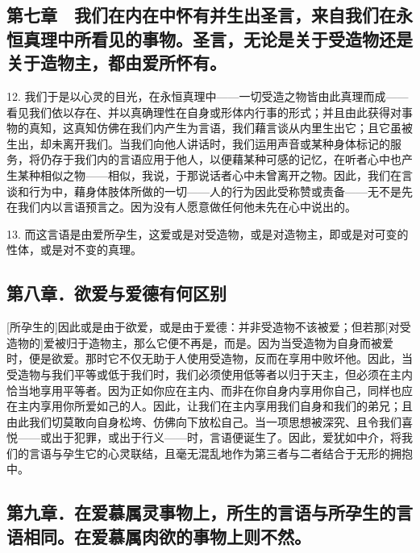 
\subsection{第七章　我们在内在中怀有并生出圣言，来自我们在永恒真理中所看见的事物。圣言，无论是关于受造物还是关于造物主，都由爱所怀有。}

12. 我们于是以心灵的目光，在永恒真理中——一切受造之物皆由此真理而成——看见我们依以存在、并以真确理性在自身或形体内行事的形式；并且由此获得对事物的真知，这真知仿佛在我们内产生为言语，我们藉言谈从内里生出它；且它虽被生出，却未离开我们。当我们向他人讲话时，我们运用声音或某种身体标记的服务，将仍存于我们内的言语应用于他人，以便藉某种可感的记忆，在听者心中也产生某种相似之物——相似，我说，于那说话者心中未曾离开之物。因此，我们在言谈和行为中，藉身体肢体所做的一切——人的行为因此受称赞或责备——无不是先在我们内以言语预言之。因为没有人愿意做任何他未先在心中说出的。\par

13. 而这言语是由爱所孕生，这爱或是对受造物，或是对造物主，即或是对可变的性体，或是对不变的真理。\par


\subsection{第八章．欲爱与爱德有何区别}

[所孕生的]因此或是由于欲爱，或是由于爱德：并非受造物不该被爱；但若那[对受造物的]爱被归于造物主，那么它便不再是，而是。因为当受造物为自身而被爱时，便是欲爱。那时它不仅无助于人使用受造物，反而在享用中败坏他。因此，当受造物与我们平等或低于我们时，我们必须使用低等者以归于天主，但必须在主内恰当地享用平等者。因为正如你应在主内、而非在你自身内享用你自己，同样也应在主内享用你所爱如己的人。因此，让我们在主内享用我们自身和我们的弟兄；且由此我们切莫敢向自身松垮、仿佛向下放松自己。当一项思想被深究、且令我们喜悦——或出于犯罪，或出于行义——时，言语便诞生了。因此，爱犹如中介，将我们的言语与孕生它的心灵联结，且毫无混乱地作为第三者与二者结合于无形的拥抱中。\par


\subsection{第九章．在爱慕属灵事物上，所生的言语与所孕生的言语相同。在爱慕属肉欲的事物上则不然。}

